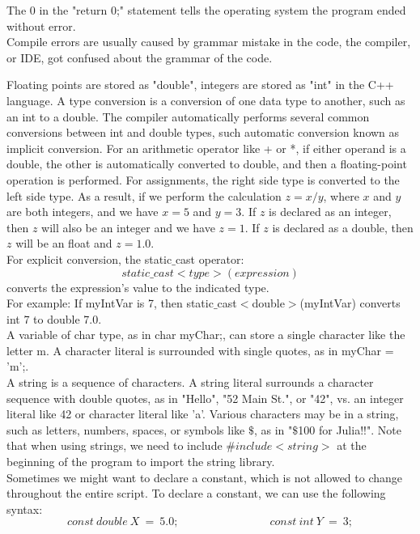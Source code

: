 \documentclass[11pt]{article}
\theoremstyle{break}
\theoremstyle{break}
\begin{document}
The 0 in the "return 0;" statement tells the operating system the program ended without error.\\

Compile errors are usually caused by grammar mistake in the code, the compiler, or IDE, got confused about the grammar of the code.\\
\newpage


Floating points are stored as "double", integers are stored as "int" in the C++ language. A type conversion is a conversion of one data type to another, such as an int to a double. The compiler automatically performs several common conversions between int and double types, such automatic conversion known as implicit conversion. For an arithmetic operator like + or *, if either operand is a double, the other is automatically converted to double, and then a floating-point operation is performed.
For assignments, the right side type is converted to the left side type. As a result, if we perform the calculation $z = x/y$, where $x$ and $y$ are both integers, and we have $x=5$ and $y=3$. If $z$ is declared as an integer, then $z$ will also be an integer and we have $z=1$. If $z$ is declared as a double, then $z$ will be an float and $z = 1.0$.\\

For explicit conversion, the static$\_$cast operator: $$static\_cast<type>(expression)$$ converts the expression's value to the indicated type. \\For example: If myIntVar is 7, then static$\_$cast$<$double$>$(myIntVar) converts int 7 to double 7.0.\\


A variable of char type, as in char myChar;, can store a single character like the letter m. A character literal is surrounded with single quotes, as in myChar = 'm';.\\

A string is a sequence of characters. A string literal surrounds a character sequence with double quotes, as in "Hello", "52 Main St.", or "42", vs. an integer literal like 42 or character literal like 'a'. Various characters may be in a string, such as letters, numbers, spaces, or symbols like $\$$, as in "$\$$100 for Julia!!". Note that when using strings, we need to include $\#include <string>$ at the beginning of the program to import the string library.\\

Sometimes we might want to declare a constant, which is not allowed to change throughout the entire script. To declare a constant, we can use the following syntax:
$$const\ double\ X\ =\ 5.0; \qquad\qquad\qquad\qquad const\ int\ Y\ =\ 3;$$
\hfill\break
\end{document}
